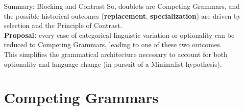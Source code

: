 \documentclass[hyperref={pdfpagelabels=false}]{beamer}
\begin{document}
\begin{frame}{Summary: Blocking and Contrast}
	So, doublets are Competing Grammars, and the possible historical outcomes (\textbf{replacement}, \textbf{specialization}) are driven by selection and the Principle of Contrast.
\vspace{6mm}\\
	\textbf{Proposal:} every case of categorical linguistic variation or optionality can be reduced to Competing Grammars, leading to one of these two outcomes.
	\vspace{3mm}\\
	This simplifies the grammatical architecture necessary to account for both optionality and language change (in pursuit of a Minimalist hypothesis).
\end{frame}



%
%
%
\section{Competing Grammars}
\end{document}
